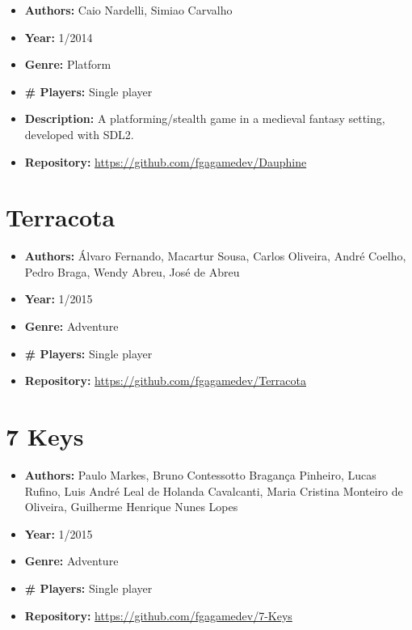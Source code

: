 \begin{apendicesenv}
\begin{itemize}
\item[] \textbf{Authors:} Caio Nardelli, Simiao Carvalho
\item[] \textbf{Year:} 1/2014
\item[] \textbf{Genre:} Platform
\item[] \textbf{\# Players:} Single player
\item[] \textbf{Description:} A platforming/stealth game in a medieval fantasy setting, developed with SDL2.
\item[] \textbf{Repository:} \url{https://github.com/fgagamedev/Dauphine}
\end{itemize}


\section{Terracota}
\label {sec:terracota}

\begin{itemize}
\item[] \textbf{Authors:} Álvaro Fernando, Macartur Sousa, Carlos Oliveira, André Coelho, Pedro Braga, Wendy Abreu, José de Abreu
\item[] \textbf{Year:} 1/2015
\item[] \textbf{Genre:} Adventure
\item[] \textbf{\# Players:} Single player
\item[] \textbf{Repository:} \url{https://github.com/fgagamedev/Terracota}
\end{itemize}

\section{7 Keys}
\label {sec:seven_keys}

\begin{itemize}
\item[] \textbf{Authors:} Paulo Markes, Bruno Contessotto Bragança Pinheiro, Lucas Rufino, Luis André Leal de Holanda Cavalcanti, Maria Cristina Monteiro de Oliveira, Guilherme Henrique Nunes Lopes
\item[] \textbf{Year:} 1/2015
\item[] \textbf{Genre:} Adventure
\item[] \textbf{\# Players:} Single player
\item[] \textbf{Repository:} \url{https://github.com/fgagamedev/7-Keys}
\end{itemize}



\end{apendicesenv}

